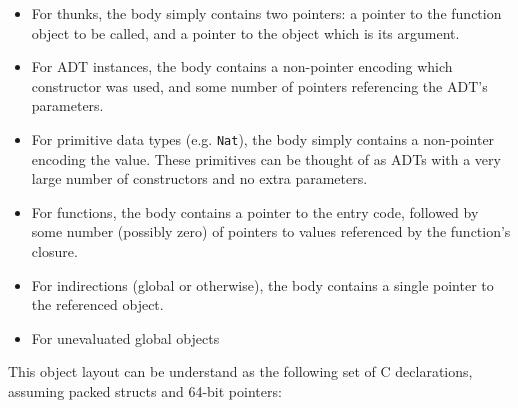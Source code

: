 \documentclass[9pt]{extarticle}
\begin{document}
\begin{itemize}
  \item For thunks, the body simply contains two pointers: a pointer to
    the function object to be called, and a pointer to the object which
    is its argument.

  \item For ADT instances, the body contains a non-pointer encoding
    which constructor was used, and some number of pointers referencing
    the ADT's parameters.

  \item For primitive data types (e.g. \verb'Nat'), the body simply
    contains a non-pointer encoding the value. These primitives can be
    thought of as ADTs with a very large number of constructors and no
    extra parameters.

  \item For functions, the body contains a pointer to the entry code,
    followed by some number (possibly zero) of pointers to values
    referenced by the function's closure.

  \item For indirections (global or otherwise), the body contains a
    single pointer to the referenced object.

  \item For unevaluated global objects
\end{itemize}

This object layout can be understand as the following set of C
declarations, assuming packed structs and 64-bit pointers:
\end{document}
